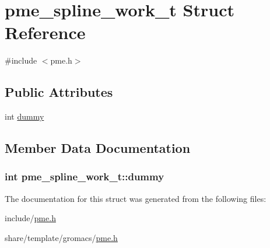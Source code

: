 \hypertarget{structpme__spline__work__t}{\section{pme\-\_\-spline\-\_\-work\-\_\-t \-Struct \-Reference}
\label{structpme__spline__work__t}
}


{\ttfamily \#include $<$pme.\-h$>$}

\subsection*{\-Public \-Attributes}
\begin{DoxyCompactItemize}
\item 
int \hyperlink{structpme__spline__work__t_a8a06c3d3159289c71679ba975b30c3a5}{dummy}
\end{DoxyCompactItemize}


\subsection{\-Member \-Data \-Documentation}
\hypertarget{structpme__spline__work__t_a8a06c3d3159289c71679ba975b30c3a5}{
\subsubsection[{dummy}]{\setlength{\rightskip}{0pt plus 5cm}int {\bf pme\-\_\-spline\-\_\-work\-\_\-t\-::dummy}}}\label{structpme__spline__work__t_a8a06c3d3159289c71679ba975b30c3a5}


\-The documentation for this struct was generated from the following files\-:\begin{DoxyCompactItemize}
\item 
include/\hyperlink{include_2pme_8h}{pme.\-h}\item 
share/template/gromacs/\hyperlink{share_2template_2gromacs_2pme_8h}{pme.\-h}\end{DoxyCompactItemize}

